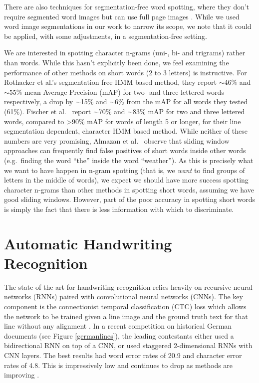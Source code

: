 \documentclass[ms,electronic,twosidetoc,letterpaper,chaptercenter,parttop,lol,lof,lot]{byumsphd}
\begin{document}
There are also techniques for segmentation-free word spotting, where they don't require segmented word images but can use full page images \cite{wilkinson2017}. While we used word image segmentations in our work to narrow its scope, we note that it could be applied, with some adjustments, in a segmentation-free setting.

We are interested in spotting character n-grams (uni-, bi- and trigrams) rather than words. While this hasn't explicitly been done, we feel examining the performance of other methods on short words (2 to 3 letters) is instructive. For Rothacker et al.'s \cite{Rothacker2013} segmentation free HMM based method, they report $\sim$46\% and $\sim$55\% mean Average Precision (mAP) for two- and three-lettered words respectively, a drop by $\sim$15\% and $\sim$6\% from the mAP for all words they tested (61\%). Fischer et al.~\cite{Fischer2012} report $\sim$70\% and $\sim$83\% mAP for two and three lettered words, compared to {\textgreater}90\% mAP for words of length 5 or longer, for their line segmentation dependent, character HMM based method. While neither of these numbers are very promising, Almazan et al.~\cite{Almazan2012} observe that sliding window approaches can frequently find false positives of short words inside other words (e.g.~finding the word ``the'' inside the word ``weather''). As this is precisely what we want to have happen in n-gram spotting (that is, we \textit{want} to find groups of letters in the middle of words), we expect we should have more success spotting character n-grams than other methods in spotting short words, assuming we have good sliding windows. However, part of the poor accuracy in spotting short words is simply the fact that there is less information with which to discriminate.%


\section{Automatic Handwriting Recognition}

The state-of-the-art for handwriting recognition relies heavily on recursive neural networks (RNNs) paired with convolutional neural networks (CNNs). The key component is the connectionist temporal classification (CTC) loss which allows the network to be trained given a line image and the ground truth text for that line without any alignment \cite{CTC}. In a recent competition on historical German documents \cite{icfhrComp2016} (see Figure \ref{germanlines}), the leading contestants either used a bidirectional RNN on top of a CNN, or used staggered 2-dimensional RNNs with CNN layers. The best results had word error rates of 20.9 and character error rates of 4.8. This is impressively low and continues to drop as methods are improving \cite{wigington2017}.
\end{document}
